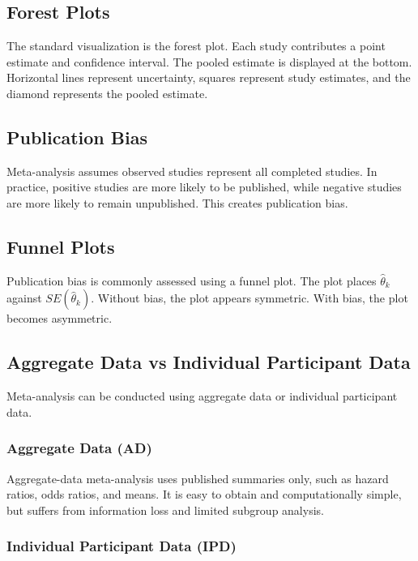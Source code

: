 \documentclass[11pt]{article}
\begin{document}
\subsection*{Forest Plots}

The standard visualization is the forest plot.
Each study contributes a point estimate and confidence interval. The pooled estimate is displayed at the bottom.
Horizontal lines represent uncertainty, squares represent study estimates, and the diamond represents the pooled estimate.

\subsection*{Publication Bias}

Meta-analysis assumes observed studies represent all completed studies.
In practice, positive studies are more likely to be published, while negative studies are more likely to remain unpublished. This creates publication bias.

\subsection*{Funnel Plots}

Publication bias is commonly assessed using a funnel plot.
The plot places $\hat{\theta}_k$ against $SE(\hat{\theta}_k)$.
Without bias, the plot appears symmetric. With bias, the plot becomes asymmetric.

\subsection*{Aggregate Data vs Individual Participant Data}

Meta-analysis can be conducted using aggregate data or individual participant data.

\subsubsection*{Aggregate Data (AD)}

Aggregate-data meta-analysis uses published summaries only, such as hazard ratios, odds ratios, and means.
It is easy to obtain and computationally simple, but suffers from information loss and limited subgroup analysis.

\subsubsection*{Individual Participant Data (IPD)}
\end{document}
